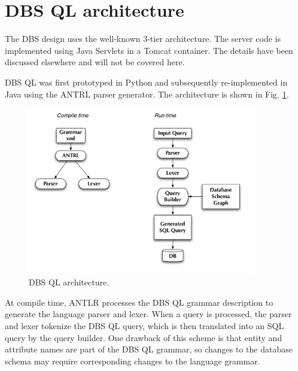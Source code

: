 \documentclass[a4paper]{jpconf}
\begin{document}
\section{DBS QL architecture}

The DBS design uses the well-known 3-tier architecture. The server
code is implemented using Java Servlets in a Tomcat container.
The details have been discussed elsewhere\cite{DBS} and will not
be covered here. 

DBS QL was first prototyped in Python and subsequently re-implemented
in Java using the ANTRL parser generator. The architecture is shown in Fig. \ref{DBS_QL}.
\begin{figure}[htb]
\centering
\includegraphics[width=100mm]{DBS_QL_architecture.pdf}
\caption{DBS QL architecture.}
\label{DBS_QL}
\end{figure}
At compile time, ANTLR\cite{ANTLR} processes the DBS QL grammar description to generate
the language parser and lexer.  When a query is processed, the parser and lexer tokenize
the DBS QL query, which is then translated into an SQL query by the query builder.
One drawback of this scheme is that entity and attribute names are part of the DBS QL
grammar, so changes to the database schema may require corresponding changes to the
language grammar.

 
\end{document}
